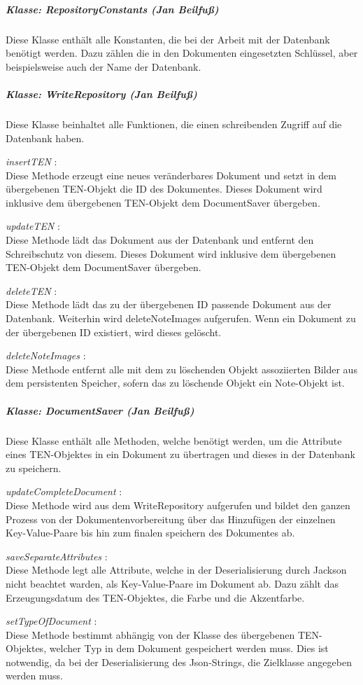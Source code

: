 \subparagraph{Klasse: RepositoryConstants (Jan Beilfuß)}
Diese Klasse enthält alle Konstanten, die bei der Arbeit mit der Datenbank benötigt werden. Dazu zählen die in den Dokumenten eingesetzten Schlüssel, aber beispielsweise auch der Name der Datenbank.

\subparagraph{Klasse: WriteRepository (Jan Beilfuß)}
Diese Klasse beinhaltet alle Funktionen, die einen schreibenden Zugriff auf die Datenbank haben. 

\textit{ insertTEN }:\\
Diese Methode erzeugt eine neues veränderbares Dokument und setzt in dem übergebenen TEN-Objekt die ID des Dokumentes. Dieses Dokument wird inklusive dem übergebenen TEN-Objekt dem DocumentSaver übergeben.

\textit{ updateTEN }:\\
Diese Methode lädt das Dokument aus der Datenbank und entfernt den Schreibschutz von diesem. Dieses Dokument wird inklusive dem übergebenen TEN-Objekt dem DocumentSaver übergeben.

\textit{ deleteTEN }:\\
Diese Methode lädt das zu der übergebenen ID passende Dokument aus der Datenbank. Weiterhin wird deleteNoteImages aufgerufen. Wenn ein Dokument zu der übergebenen ID existiert, wird dieses gelöscht.

\textit{ deleteNoteImages }:\\
Diese Methode entfernt alle mit dem zu löschenden Objekt assoziierten Bilder aus dem persistenten Speicher, sofern das zu löschende Objekt ein Note-Objekt ist.

\subparagraph{Klasse: DocumentSaver (Jan Beilfuß)}
Diese Klasse enthält alle Methoden, welche benötigt werden, um die Attribute eines TEN-Objektes in ein Dokument zu übertragen und dieses in der Datenbank zu speichern.

\textit{ updateCompleteDocument }:\\
Diese Methode wird aus dem WriteRepository aufgerufen und bildet den ganzen Prozess von der Dokumentenvorbereitung über das Hinzufügen der einzelnen Key-Value-Paare bis hin zum finalen speichern des Dokumentes ab.

\textit{ saveSeparateAttributes }:\\
Diese Methode legt alle Attribute, welche in der Deserialisierung durch Jackson nicht beachtet warden, als Key-Value-Paare im Dokument ab. Dazu zählt das Erzeugungsdatum des TEN-Objektes, die Farbe und die Akzentfarbe.

\textit{ setTypeOfDocument }:\\
Diese Methode bestimmt abhängig von der Klasse des übergebenen TEN-Objektes, welcher Typ in dem Dokument gespeichert werden muss. Dies ist notwendig, da bei der Deserialisierung des Json-Strings, die Zielklasse angegeben werden muss.

